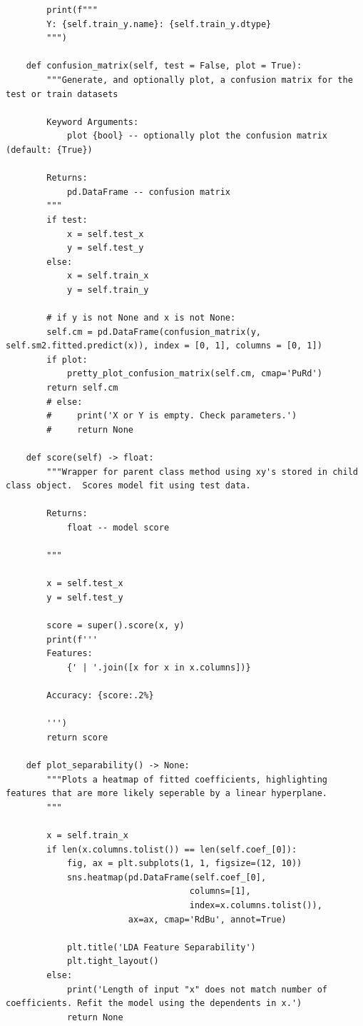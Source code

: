 \begin{verbatim}
        print(f"""
        Y: {self.train_y.name}: {self.train_y.dtype}
        """)

    def confusion_matrix(self, test = False, plot = True):
        """Generate, and optionally plot, a confusion matrix for the test or train datasets

        Keyword Arguments:
            plot {bool} -- optionally plot the confusion matrix (default: {True})

        Returns:
            pd.DataFrame -- confusion matrix
        """
        if test:
            x = self.test_x
            y = self.test_y
        else:
            x = self.train_x
            y = self.train_y

        # if y is not None and x is not None:
        self.cm = pd.DataFrame(confusion_matrix(y, self.sm2.fitted.predict(x)), index = [0, 1], columns = [0, 1])
        if plot:
            pretty_plot_confusion_matrix(self.cm, cmap='PuRd')
        return self.cm
        # else:
        #     print('X or Y is empty. Check parameters.')
        #     return None

    def score(self) -> float:
        """Wrapper for parent class method using xy's stored in child class object.  Scores model fit using test data.

        Returns:
            float -- model score

        """

        x = self.test_x
        y = self.test_y

        score = super().score(x, y)
        print(f'''
        Features:
            {' | '.join([x for x in x.columns])}

        Accuracy: {score:.2%}

        ''')
        return score

    def plot_separability() -> None:
        """Plots a heatmap of fitted coefficients, highlighting features that are more likely seperable by a linear hyperplane.
        """

        x = self.train_x
        if len(x.columns.tolist()) == len(self.coef_[0]):
            fig, ax = plt.subplots(1, 1, figsize=(12, 10))
            sns.heatmap(pd.DataFrame(self.coef_[0],
                                    columns=[1],
                                    index=x.columns.tolist()),
                        ax=ax, cmap='RdBu', annot=True)

            plt.title('LDA Feature Separability')
            plt.tight_layout()
        else:
            print('Length of input "x" does not match number of coefficients. Refit the model using the dependents in x.')
            return None


\end{verbatim}
